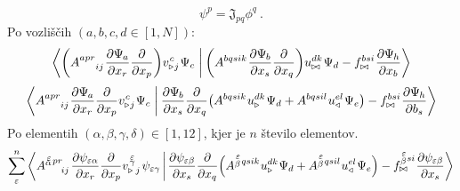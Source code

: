 \begin{equation}
   \psi^p = \mathfrak{J}_{pq} \phi^{q} \ .
   \label{eq:refToEmt}
\end{equation}
Po vozliščih $(a, b, c, d \in [1,N])$:
\begin{equation}
   \braket{
      \qty(A^{a p r}_{\mkern28mu i j} \mkern1mu
      \pdv{\Psi_{\mkern-1mu a}}{x_r} \pdv{}{x_p})
      v^{\mkern1mu c}_{\triangleright \mkern1mu j} \mkern1mu \Psi_c \mkern5mu  }
   {
      \mkern4mu \qty(A^{b q s i k} \mkern1mu
      \pdv{\Psi_{\mkern-1mu b}}{x_s} \pdv{}{x_q} )
      u^{d k}_{\bowtie} \mkern1mu \Psi_d
      -
      f^{b s i}_{\bowtie} \mkern1mu \pdv{\Psi_{\mkern-1mu h}}{x_b} }
\end{equation}
\begin{equation}
   \braket{
      A^{a p r}_{\mkern28mu i j} \mkern1mu
      \pdv{\Psi_{\mkern-1mu a}}{x_r} \pdv{}{x_p}
      v^{\mkern1mu c}_{\triangleright \mkern1mu j} \mkern1mu \Psi_c \mkern5mu  }
   {
         \mkern4mu
      \pdv{\Psi_{\mkern-1mu b}}{x_s}
      \pdv{}{x_q}
         \qty(
      A^{b q s i k} \mkern1mu
      u^{d k}_\triangleright \mkern1mu \Psi_d
      +
      A^{b q s i l} \mkern1mu
      u^{e l}_\triangleleft \mkern1mu \Psi_e )
      -
      f^{b s i}_{\bowtie} \mkern1mu \pdv{\Psi_{\mkern-1mu h}}{b_s} }
\end{equation}
Po elementih $(\alpha, \beta, \gamma, \delta) \in [1,12]$, kjer je $n$ število elementov.
\begin{equation}
   \sum^n_{\varepsilon}
   \braket{
      A^{\substack{\mkern2mu \varepsilon \\[-0.65mm] \alpha} \mkern2mu p r}_{\mkern29mu i j} \mkern2mu
      \pdv{\psi_{ \varepsilon \alpha}}{x_r} \pdv{}{x_p}
      v^{\mkern 2mu \substack{\varepsilon \\[-0.65mm] \gamma \\[-0.2mm]}}_{\triangleright \mkern5mu j} \mkern2mu
      \psi_{\varepsilon \gamma} \mkern3mu }
   {
         \mkern2mu
      \pdv{\psi_{\varepsilon \beta}}{x_s}
      \frac{\partial}{\partial x_q}
         \qty(
      A^{\substack{\mkern2mu \varepsilon \\[0.05mm] \beta} \mkern2mu q s i k} \mkern1mu
      u^{d k}_\triangleright \mkern1mu \Psi_d
      +
      A^{\substack{\mkern2mu \varepsilon \\[0.05mm] \beta} \mkern2mu q s i l} \mkern1mu
      u^{e l}_\triangleleft \mkern1mu \Psi_e
         ) -
      f^{\substack{\mkern2mu \varepsilon \\[0.05mm] \beta} \mkern1mu s i}_{\bowtie} \mkern1mu
      \pdv{\psi_{\varepsilon \beta}}{x_s}}
\end{equation}
